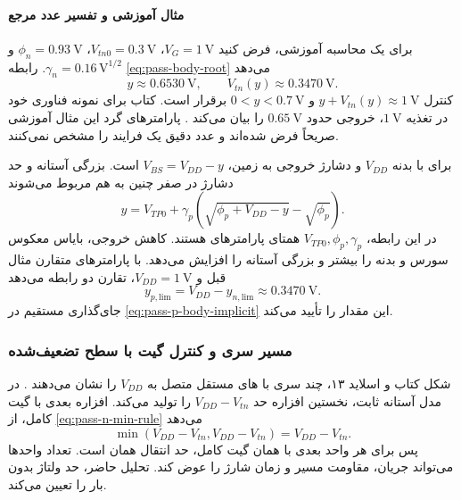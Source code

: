 \paragraph*{مثال آموزشی و تفسیر عدد مرجع}
برای یک محاسبه آموزشی، فرض کنید
\(V_G=\qty{1}{\volt}\)، \(V_{tn0}=\qty{0.3}{\volt}\)،
\(\phi_n=\qty{0.93}{\volt}\) و
\(\gamma_n=0.16\,\unit{\volt}^{1/2}\).
رابطه \eqref{eq:pass-body-root} می‌دهد
\begin{equation*}
 y\approx\qty{0.6530}{\volt},\qquad
 V_{tn}(y)\approx\qty{0.3470}{\volt}.
\end{equation*}
کنترل \(y+V_{tn}(y)\approx\qty{1}{\volt}\) و
\(0<y<\qty{0.7}{\volt}\) برقرار است.
کتاب برای نمونه فناوری خود در تغذیه \(\qty{1}{\volt}\)،
خروجی حدود \(\qty{0.65}{\volt}\) را بیان می‌کند
\cite[صفحه ۹۲]{weste}. پارامترهای گرد این مثال آموزشی
صریحاً فرض شده‌اند و عدد دقیق یک فرایند را مشخص نمی‌کنند.

برای  با بدنه \(V_{DD}\) و دشارژ خروجی به زمین،
\(V_{BS}=V_{DD}-y\) است. بزرگی آستانه و حد دشارژ در
 صفر چنین به هم مربوط می‌شوند
\begin{equation}
 y=V_{TP0}+\gamma_p
   \left(\sqrt{\phi_p+V_{DD}-y}-\sqrt{\phi_p}\right).
 \label{eq:pass-p-body-implicit}
\end{equation}
در این رابطه، \(V_{TP0},\phi_p,\gamma_p\) همتای پارامترهای
 هستند. کاهش خروجی، بایاس معکوس سورس و بدنه را
بیشتر و بزرگی آستانه را افزایش می‌دهد.
با پارامترهای متقارن مثال قبل و \(V_{DD}=\qty{1}{\volt}\)،
تقارن دو رابطه می‌دهد
\[
 y_{p,\mathrm{lim}}=V_{DD}-y_{n,\mathrm{lim}}
 \approx\qty{0.3470}{\volt}.
\]
جای‌گذاری مستقیم در \eqref{eq:pass-p-body-implicit} این
مقدار را تأیید می‌کند.

\subsubsection{مسیر سری و کنترل گیت با سطح تضعیف‌شده}
\label{sec:pass-cascade}
شکل  کتاب و اسلاید ۱۳، چند 
سری با های مستقل متصل به \(V_{DD}\) را نشان
می‌دهند \cite{weste,dcslides}. در مدل آستانه ثابت، نخستین
افزاره حد \(V_{DD}-V_{tn}\) را تولید می‌کند.
افزاره بعدی با گیت کامل، از \eqref{eq:pass-n-min-rule} می‌دهد
\begin{equation*}
 \min(V_{DD}-V_{tn},V_{DD}-V_{tn})=V_{DD}-V_{tn}.
\end{equation*}
پس برای هر واحد بعدی با همان گیت کامل، حد انتقال همان است.
تعداد واحدها می‌تواند جریان، مقاومت مسیر و زمان شارژ را عوض
کند. تحلیل حاضر، حد ولتاژ بدون بار  را تعیین می‌کند.


